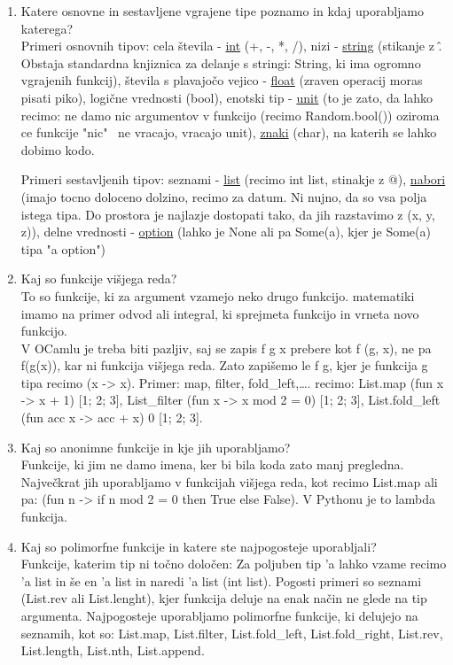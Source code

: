 \documentclass[a4paper]{article}
\begin{document}
\begin{enumerate}
        \item Katere osnovne in sestavljene vgrajene tipe poznamo in kdaj uporabljamo katerega?\\
        Primeri osnovnih tipov: cela števila - \underline{int} (+, -, *, /), nizi - \underline{string} (stikanje z \^. Obstaja standardna knjiznica za delanje s stringi: String, ki ima ogromno vgrajenih funkcij), števila s plavajočo vejico - \underline{float} (zraven operacij moras pisati piko), logične vrednosti (bool), enotski tip - \underline{unit} (to je zato, da lahko recimo: ne damo nic argumentov v funkcijo (recimo Random.bool()) oziroma ce funkcije "nic" \ ne vracajo, vracajo unit), \underline{znaki} (char), na katerih se lahko dobimo kodo.


        Primeri sestavljenih tipov: seznami - \underline{list} (recimo int list, stinakje z @), \underline{nabori} (imajo tocno doloceno dolzino, recimo za datum. Ni nujno, da so vsa polja istega tipa. Do prostora je najlazje dostopati tako, da jih razstavimo z (x, y, z)), delne vrednosti - \underline{option} (lahko je None ali pa Some(a), kjer je Some(a) tipa "a option")
    
        \item Kaj so funkcije višjega reda?\\
        To so funkcije, ki za argument vzamejo neko drugo funkcijo.  matematiki imamo na primer odvod ali integral, ki sprejmeta funkcijo in vrneta novo funkcijo.\\
        V OCamlu je treba biti pazljiv, saj se zapis f g x prebere kot f (g, x), ne pa f(g(x)), kar ni funkcija višjega reda. Zato zapišemo le f g, kjer je funkcija g tipa recimo (x -> x). Primer: map, filter, fold\_left,\ldots. recimo: List.map (fun x -> x + 1) [1; 2; 3], List\_filter (fun x -> x mod 2 = 0) [1; 2; 3], List.fold\_left (fun acc x -> acc + x) 0 [1; 2; 3].
    
        \item Kaj so anonimne funkcije in kje jih uporabljamo?\\
        Funkcije, ki jim ne damo imena, ker bi bila koda zato manj pregledna. Največkrat jih uporabljamo v funkcijah višjega reda, kot recimo List.map ali pa: (fun n -> if n mod 2 = 0 then True else False). V Pythonu je to lambda funkcija.
    
        \item Kaj so polimorfne funkcije in katere ste najpogosteje uporabljali?\\
        Funkcije, katerim tip ni točno določen: Za poljuben tip 'a lahko vzame recimo 'a list in še en 'a list in naredi 'a list (int list). Pogosti primeri so seznami (List.rev ali List.lenght), kjer funkcija deluje na enak način ne glede na tip argumenta.
        Najpogosteje uporabljamo polimorfne funkcije, ki delujejo na seznamih, kot so: List.map, List.filter, List.fold\_left, List.fold\_right, List.rev, List.length, List.nth, List.append.
    

\end{enumerate}
\end{document}
